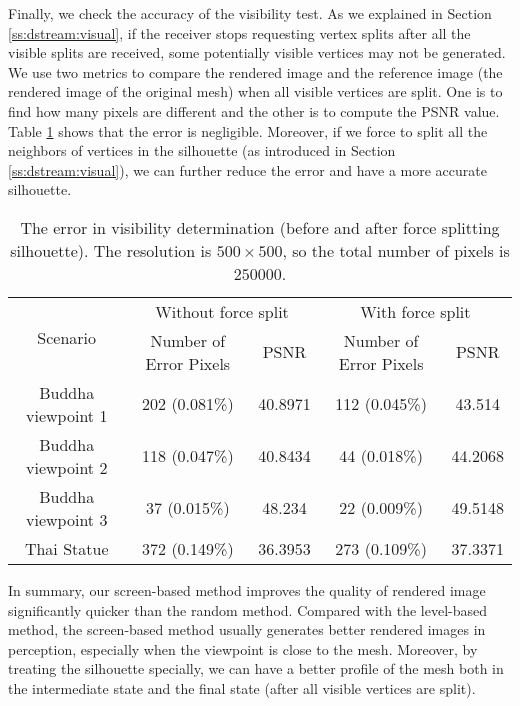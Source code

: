 Finally, we check the accuracy of the visibility test. 
As we explained in Section \ref{ss:dstream:visual}, 
if the receiver stops requesting vertex splits after all the visible splits are received,
some potentially visible vertices may not be generated.
We use two metrics to compare the rendered image and the reference image (the rendered image of the original mesh)
when all visible vertices are split. One is to find
how many pixels are different and the other is to compute the PSNR value. 
Table \ref{t:dstream:error} shows that the error is negligible.
Moreover, if we force to split all the neighbors of vertices in the silhouette
(as introduced in Section \ref{ss:dstream:visual}),
we can further reduce the error and have a more accurate silhouette.
\begin{table}
    \centering
    \begin{tabular}{|c|c|c|c|c|}
        \hline
        \multirow{2}{*}{Scenario}    &    \multicolumn{2}{c|}{Without force split}   & \multicolumn{2}{c|}{With force split}\\
        \cline{2-5}
         &   Number of Error Pixels   &   PSNR    &  Number of Error Pixels  & PSNR \\
        \hline
        Buddha viewpoint 1 &          202 (0.081\%)    &   40.8971 &  112 (0.045\%)               &    43.514\\
        Buddha viewpoint 2 &          118 (0.047\%)    &   40.8434 &  44  (0.018\%)               &    44.2068\\
        Buddha viewpoint 3 &           37 (0.015\%)    &   48.234  &  22  (0.009\%)               &    49.5148\\
        Thai   Statue      &          372 (0.149\%)    &   36.3953 &  273 (0.109\%)               &    37.3371\\
        \hline
    \end{tabular}
    \caption[The error in visibility determination (before and after force splitting silhouette)]
    {The error in visibility determination (before and after force splitting silhouette).
    The resolution is $500 \times 500$, so the total number of pixels is $250000$.}
    \label{t:dstream:error}
\end{table}

In summary, our screen-based method improves the quality of rendered image significantly quicker than the random method. Compared
with the level-based method, 
the screen-based method usually generates better rendered images in perception, especially when the viewpoint is close to the mesh. 
Moreover, by treating the silhouette specially, we can have a better profile of the mesh both in the intermediate state and the final state (after
all visible vertices are split). 


